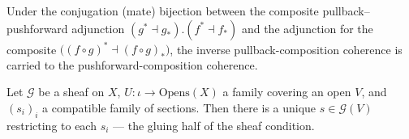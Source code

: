 \begin{lemma}
  \label{mk-lem:conjugateEquiv_pullbackComp_inv_mathlib}
  \mathlibok

  Under the conjugation (mate) bijection between the composite pullback--pushforward
  adjunction \((g^{*}\dashv g_{*}) . (f^{*}\dashv f_{*})\) and the adjunction for the
  composite \(\bigl((f\circ g)^{*} \dashv (f\circ g)_{*}\bigr)\), the inverse
  pullback-composition coherence is carried to the pushforward-composition coherence.
\end{lemma}

\begin{lemma}
  \label{mk-lem:sheaf_existsUnique_gluing_mathlib}
  \mathlibok

  Let \(\mathcal{G}\) be a sheaf on \(X\), \(U : \iota \to \mathrm{Opens}(X)\) a family covering an
  open \(V\), and \((s_i)_i\) a compatible family of sections. Then there is a unique
  \(s \in \mathcal{G}(V)\) restricting to each \(s_i\) --- the gluing half of the sheaf condition.
\end{lemma}

